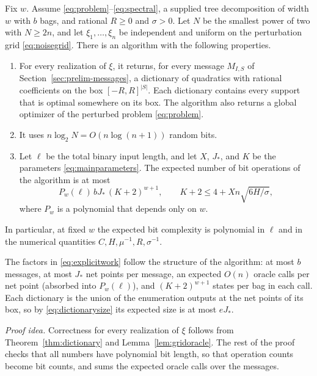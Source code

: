 \begin{theorem}\label{thm:main}
Fix $w$. Assume \eqref{eq:problem}--\eqref{eq:spectral}, a supplied tree
decomposition of width $w$ with $b$ bags, and rational $R\ge0$ and
$\sigma>0$. Let $N$ be the smallest power of two with $N\ge2n$, and let
$\xi_1,\ldots,\xi_n$ be independent and uniform on the perturbation grid
\eqref{eq:noisegrid}. There is an algorithm with the following
properties.
\begin{enumerate}
\item For every realization of $\xi$, it returns, for every message
 $M_{I,S}$ of Section~\ref{sec:prelim-messages}, a dictionary of
 quadratics with rational coefficients on the box $[-R,R]^{|S|}$. Each
 dictionary contains every support that is optimal somewhere on its box.
 The algorithm also returns a global optimizer of the perturbed problem
 \eqref{eq:problem}.
\item It uses $n\log_2N=O(n\log(n+1))$ random bits.
\item Let $\ell$ be the total binary input length, and let $X$, $J_*$,
 and $K$ be the parameters \eqref{eq:mainparameters}. The expected
 number of bit operations of the algorithm is at most
 \begin{equation}\label{eq:explicitwork}
  P_w(\ell)\,bJ_*\,(K+2)^{w+1},\qquad
  K+2\le4+Xn\sqrt{6H/\sigma},
 \end{equation}
 where $P_w$ is a polynomial that depends only on $w$.
\end{enumerate}
In particular, at fixed $w$ the expected bit complexity is polynomial in
$\ell$ and in the numerical quantities $C,H,\mu^{-1},R,\sigma^{-1}$.
\end{theorem}

The factors in \eqref{eq:explicitwork} follow the structure of the
algorithm: at most $b$ messages, at most $J_*$ net points per message,
an expected $O(n)$ oracle calls per net point (absorbed into
$P_w(\ell)$), and $(K+2)^{w+1}$ states per bag in each call. Each
dictionary is the union of the enumeration outputs at the net points of
its box, so by \eqref{eq:dictionarysize} its expected size is at most
$eJ_*$.

\emph{Proof idea.} Correctness for every realization of $\xi$ follows
from Theorem~\ref{thm:dictionary} and Lemma~\ref{lem:gridoracle}. The
rest of the proof checks that all numbers have polynomial bit length, so
that operation counts become bit counts, and sums the expected oracle
calls over the messages.

